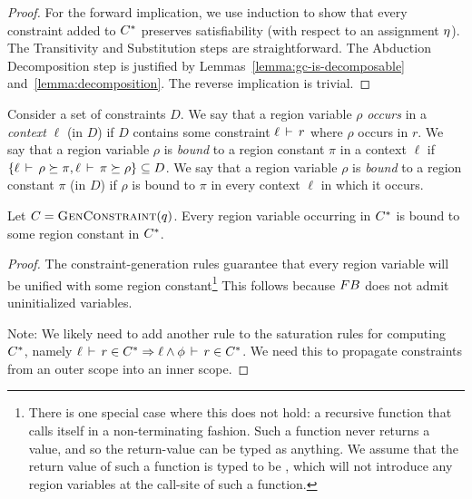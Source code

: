 \begin{proof}
  For the forward implication, we use induction to show that every constraint
  added to ${C}^*$ preserves satisfiability (with respect to an assignment $\eta$).
  The Transitivity and Substitution steps are straightforward. The Abduction Decomposition
  step is justified by Lemmas~\ref{lemma:gc-is-decomposable} and~\ref{lemma:decomposition}.
  The reverse implication is trivial.
\end{proof}

Consider a set of constraints $D$. We say that a region variable $\rho$
\emph{occurs} in a \emph{context} $\ell$ (in $D$) if $D$ contains some
constraint $\ell\,\vdash\,r$ where $\rho$ occurs in $r$.
We say that a region variable $\rho$ is \emph{bound} to a region constant
$\pi$ in a context $\ell$ if
$\{ \ell\,\vdash\,\rho \succeq \pi, \ell\,\vdash\,\pi \succeq \rho \} \subseteq D$.
We say that a region variable $\rho$ is \emph{bound} to a region constant $\pi$ (in $D$) if
$\rho$ is bound to $\pi$ in every context $\ell$ in which it occurs.

\begin{lemma}
  \label{lemma:completely-bound}
Let $C = \textsc{GenConstraint}(q)$.
Every region variable occurring in ${C}^*$ is bound to some region constant in ${C}^*$.
\end{lemma}

\begin{proof}
The constraint-generation rules guarantee that every region variable will
be unified with some region constant\footnote{
There is one special case where this does not hold: a recursive function
that calls itself in a non-terminating fashion. Such a function never
returns a value, and so the return-value can be typed as anything.
We assume that the return value of such a function is typed to be ,
which will not introduce any region variables at the call-site of such a function.}
This follows because ${\sc FB}$ does not admit uninitialized variables.

Note: We likely need to add another rule to the saturation rules for computing
${C}^*$, namely $\ell\,\vdash\,r \in {C}^* \Rightarrow \ell \wedge \phi\,\vdash\,r \in {C}^*$.
We need this to propagate constraints from an outer scope into an inner scope.

\end{proof}


